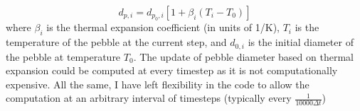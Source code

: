 \begin{equation}
	d_{p,i} = d_{p_0,i}\left[1+\beta_i\left(T_i - T_0\right)\right]
\end{equation}
where $\beta_i$ is the thermal expansion coefficient (in units of \si{1/K}), $T_i$ is the temperature of the pebble at the current step, and $d_{0,i}$ is the initial diameter of the pebble at temperature $T_0$. The update of pebble diameter based on thermal expansion could be computed at every timestep as it is not computationally expensive. All the same, I have left flexibility in the code to allow the computation at an arbitrary interval of timesteps (typically every $\frac{1}{10000\Delta t}$)

